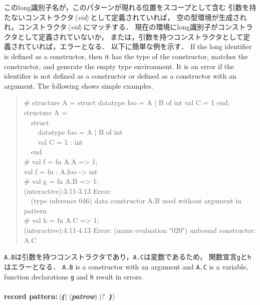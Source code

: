\documentclass{jbook}
\newcommand{\txt}[2]{#2}
\newcommand{\code}[1]{\mbox{\large\tt #1}}
\newcommand{\nonterm}[1]{\mbox{$\,\langle$}{\it #1}\mbox{$\rangle\,$}}
\newcommand{\term}[1]{\mbox{{\tt #1}}}
\newcommand{\optional}[1]{\mbox{$($}{\protect #1}\mbox{$)?$}}
\newcommand{\myem}{\mbox{\ \ }}
\newenvironment{program}{\begin{quote}\begin{tt}}%
                        {\end{tt}\end{quote}}
\begin{document}
\ifjp%
	このlong識別子名が，このパターンが現れる位置をスコープとして含む
引数を持たないコンストラクタ\nonterm{vid}として定義されていれば，
空の型環境が生成されれ，コンストラクタ\nonterm{vid}にマッチする．
	現在の環境にlong識別子がコンストラクタとして定義されていないか，
または，引数を持つコンストラクタとして定義されていれば，エラーとなる．
	以下に簡単な例を示す．
\else%
	If the long identifier is defined as a constructor, then it has the
type of the constructor, matches the constructor, and generate the empty
type environment.
	It is an error if the identifier is not defined as a constructor
or defined as a constructor with an argument.
	The following shows simple examples.
\fi%

\begin{program}
\# structure A = struct datatype foo = A | B of int val C = 1 end;\\
structure A =\\
\myem  struct\\
\myem\myem    datatype foo = A | B of int\\
\myem\myem    val C = 1 : int\\
\myem  end\\
\# val f = fn A.A => 1;\\
val f = fn : A.foo -> int\\
\# val g = fn A.B => 1;\\
(interactive):3.11-3.13 Error:\\
\myem  (type inference 046) data constructor A.B used without argument in pattern\\
\# val h = fn A.C => 1;\\
(interactive):4.11-4.13 Error: (name evaluation "020") unbound constructor: A.C
\end{program}

\ifjp%
	\code{A.B}は引数を持つコンストラクタであり，\code{A.C}は変数であるため，
関数宣言\code{g}と\code{h}はエラーとなる．
\else%
	\code{A.B} is a constructor with an argument and \code{A.C} is a
variable, function declarations \code{g} and \code{h} result in errors.
\fi%


\paragraph{\txt{レコードパターン}{record pattern}:\nonterm{\term{\{}\optional{\nonterm{patrow}}\ \term{\}}}}
\end{document}
